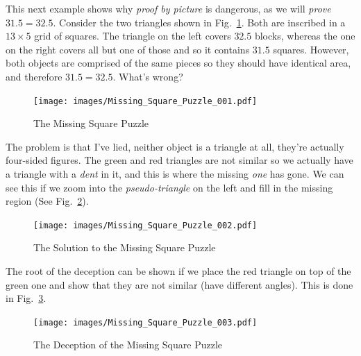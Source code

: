         \begin{example}
            \label{ex:Missing_Square_Puzzle}%
            This next example shows why \textit{proof by picture}%
             is dangerous, as we will \textit{prove}
            $31.5=32.5$. Consider the two triangles shown in
            Fig.~\ref{fig:Missing_Square_Puzzle}. Both are inscribed in a
            $13\times{5}$ grid of squares. The triangle on the left covers
            $32.5$ blocks, whereas the one on the right covers all but one of
            those and so it contains $31.5$ squares. However, both objects are
            comprised of the same pieces so they should have identical area, and
            therefore $31.5=32.5$. What's wrong?
            \begin{figure}[H]
                \centering
                \captionsetup{type=figure}
                \texttt{[image: images/Missing\_Square\_Puzzle\_001.pdf]}
                \caption{The Missing Square Puzzle}
                \label{fig:Missing_Square_Puzzle}
            \end{figure}
            The problem is that I've lied, neither object is a triangle at all,
            they're actually four-sided figures. The green and red triangles are
            not similar so we actually have a triangle with a \textit{dent} in
            it, and this is where the missing \textit{one} has gone. We can see
            this if we zoom into the \textit{pseudo-triangle} on the left and
            fill in the missing region
            (See Fig.~\ref{fig:Missing_Square_Puzzle_Solution}).
            \begin{figure}[H]
                \centering
                \captionsetup{type=figure}
                \texttt{[image: images/Missing\_Square\_Puzzle\_002.pdf]}
                \caption{The Solution to the Missing Square Puzzle}
                \label{fig:Missing_Square_Puzzle_Solution}
            \end{figure}
            The root of the deception can be shown if we place the red triangle
            on top of the green one and show that they are not similar (have
            different angles). This is done in
            Fig.~\ref{fig:Missing_Square_Puzzle_Deception}.
        \end{example}
        \begin{figure}[H]
            \centering
            \captionsetup{type=figure}
            \texttt{[image: images/Missing\_Square\_Puzzle\_003.pdf]}
            \caption{The Deception of the Missing Square Puzzle}
            \label{fig:Missing_Square_Puzzle_Deception}
        \end{figure}
